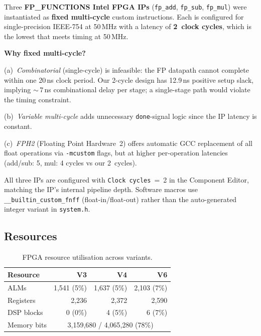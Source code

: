 \documentclass[a4paper,10pt,twocolumn]{article}
\begin{document}
Three \textbf{FP\_FUNCTIONS Intel FPGA IPs} (\texttt{fp\_add}, \texttt{fp\_sub}, \texttt{fp\_mul}) were instantiated as \textbf{fixed multi-cycle} custom instructions.
Each is configured for single-precision IEEE-754 at 50\,MHz with a latency of \textbf{2~clock cycles}, which is the lowest that meets timing at 50\,MHz.

\textbf{Why fixed multi-cycle?}

(a)~\emph{Combinatorial} (single-cycle) is infeasible: the FP datapath cannot complete within one 20\,ns clock period.
Our 2-cycle design has 12.9\,ns positive setup slack, implying ${\sim}\,7$\,ns combinational delay per stage; a single-stage path would violate the timing constraint.

(b)~\emph{Variable multi-cycle} adds unnecessary \texttt{done}-signal logic since the IP latency is constant.

(c)~\emph{FPH2} (Floating Point Hardware~2) offers automatic GCC replacement of all float operations via \texttt{-mcustom} flags, but at higher per-operation latencies (add/sub: 5, mul: 4 cycles vs our 2~cycles).

All three IPs are configured with \texttt{Clock cycles}~=~2 in the Component Editor, matching the IP's internal pipeline depth.
Software macros use \texttt{\_\_builtin\_custom\_fnff} (float-in/float-out) rather than the auto-generated integer variant in \texttt{system.h}.

\subsection{Resources}

\begin{table}[H]
\centering
\caption{FPGA resource utilisation across variants.}
\label{tab:resources_all}
\small
\begin{tabular}{lrrr}
\toprule
\textbf{Resource} & \textbf{V3} & \textbf{V4} & \textbf{V6} \\
\midrule
ALMs        & 1{,}541 (5\%) & 1{,}637 (5\%) & 2{,}103 (7\%) \\
Registers   & 2{,}236       & 2{,}372       & 2{,}590       \\
DSP blocks  & 0 (0\%)     & 4 (5\%)     & 6 (7\%)     \\
Memory bits & \multicolumn{3}{c}{3{,}159{,}680 / 4{,}065{,}280 (78\%)} \\
\bottomrule
\end{tabular}
\end{table}
\end{document}
